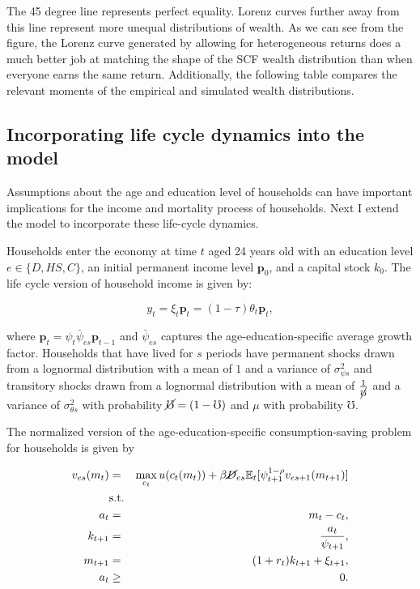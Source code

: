 \par The 45 degree line represents perfect equality. Lorenz curves further away from this line represent more unequal distributions of wealth. As we can see from the figure, the Lorenz curve generated by allowing for heterogeneous returns does a much better job at matching the shape of the SCF wealth distribution than when everyone earns the same return. Additionally, the following table compares the relevant moments of the empirical and simulated wealth distributions.



\FloatBarrier

\subsection{Incorporating life cycle dynamics into the model}

\par Assumptions about the age and education level of households can have important implications for the income and mortality process of households. Next I extend the model to incorporate these life-cycle dynamics.

\par Households enter the economy at time $t$ aged 24 years old with an education level $e \in \{D,HS,C\}$, an initial permanent income level $\textbf{p}_0$, and a capital stock $k_0$. The life cycle version of household income is given by:

$$ y_t = \xi_t \textbf{p}_t = (1 - \tau) \theta_t \textbf{p}_t, $$

where $\textbf{p}_t = \psi_t \bar{\psi}_{es} \textbf{p}_{t-1}$ and $\bar{\psi}_{es}$ captures the age-education-specific average growth factor. Households that have lived for $s$ periods have permanent shocks drawn from a lognormal distribution with a mean of $1$ and a variance of $\sigma^{2}_{\psi s}$ and transitory shocks drawn from a lognormal distribution with a mean of $\frac{1}{\cancel{\mho}}$ and a variance of $\sigma^{2}_{\theta s}$ with probability $\cancel{\mho} = (1-\mho)$ and $\mu$ with probability $\mho$.

\par The normalized version of the age-education-specific consumption-saving problem for households is given by

\begin{eqnarray*}
  v_{es}(m_t) &=& \max_{c_t} u(c_t(m_t)) + \beta \cancel{D}_{es} \mathbb{E}_{t}[\psi_{t+1}^{1-\rho}v_{es + 1}(m_{t+1})] \\
  &\text{s.t.}& \\
  a_t &=& m_t - c_t, \\
  k_{t+1} &=& \frac{a_t}{\psi_{t+1}}, \\
  m_{t+1} &=& (1 + r_t)k_{t+1} + \xi_{t+1}, \\
  a_t &\geq& 0.
\end{eqnarray*}

